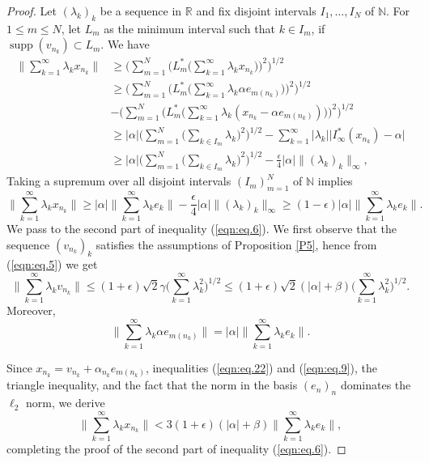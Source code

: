 \documentclass[12pt]{amsart}
\theoremstyle{plain}
\numberwithin{equation}{section}
\newcommand{\N}{\mathbb{N}}
\newcommand{\R}{\mathbb{R}}
\DeclareMathOperator{\supp}{supp}
\begin{document}
\begin{proof}
Let $(\lambda_k)_k$ be a sequence in $\R$ and fix disjoint intervals $I_1,\ldots,I_N$ of $\N$. For $1\leq m\leq N$, let
$L_m$ as the minimum interval such that $k\in I_m$, if $\supp(v_{n_k}) \subset L_m$. We have
\begin{align*}
\Big\|\sum_{k=1}^\infty\lambda_k x_{n_k}\Big\| &\geq \Big(\sum_{m=1}^N\Big( L_m^*\Big( \sum_{k=1}^\infty \lambda_k x_{n_k}\Big) \Big)^2\Big)^{1/2}\\
&\geq \Big(\sum_{m=1}^N\Big( L_m^* \Big(\sum_{k = 1}^\infty \lambda_k \alpha e_{m(n_k)}\Big)\Big)^2\Big)^{1/2}\\
&- \Big(\sum_{m=1}^N\Big(  L_m^*\Big(\sum_{k=1}^\infty \lambda_k (x_{n_k}-\alpha e_{m(n_k)}) \Big)\Big)^2\Big)^{1/2}\\
&\geq |\alpha|\Big(\sum_{m=1}^N\Big(\sum_{k\in I_m}\lambda_k\Big)^2\Big)^{1/2} - \sum_{k=1}^\infty|\lambda_k|\Big|I^*_\infty(x_{n_k}) - \alpha\Big|\\
&\geq |\alpha|\Big(\sum_{m=1}^N\Big(\sum_{k\in I_m}\lambda_k\Big)^2\Big)^{1/2} -\frac{\epsilon}{4}|\alpha|\|(\lambda_k)_k\|_\infty,
\end{align*}
Taking a supremum over all disjoint intervals $(I_m)_{m=1}^N$ of $\N$ implies
\[ \Big\| \sum_{k=1}^\infty \lambda_k x_{n_k}\Big\| \geq |\alpha| \Big\| \sum_{k=1}^\infty \lambda_k e_{k}\Big\|  - \frac{\epsilon}{4}|\alpha|\|(\lambda_k)_k\|_\infty\geq (1-\epsilon)|\alpha|\Big\| \sum_{k=1}^\infty \lambda_k e_{k}\Big\|. \]
We pass to the second part of inequality (\ref{eqn:eq.6}).
We first observe that the sequence $(v_{n_k})_k$ satisfies the assumptions of Proposition \ref{P5}, hence from (\ref{eqn:eq.5}) we get
\begin{equation}\label{eqn:eq.22}
\Big\|\sum_{k=1}^\infty \lambda_k v_{n_k}\Big\| \le (1+\epsilon)\sqrt{2} \gamma \Big(\sum_{k=1}^\infty \lambda_k^2\Big)^{1/2} \leq (1+\epsilon)\sqrt{2} (|\alpha| + \beta) \Big(\sum_{k=1}^\infty \lambda_k^2\Big)^{1/2}.
\end{equation}
Moreover,
\begin{equation}\label{eqn:eq.9}
\Big\| \sum_{k=1}^\infty \lambda_k \alpha e_{m(n_k)}\Big\| = |\alpha| \Big\| \sum_{k=1}^\infty \lambda_k e_k \Big\|.
\end{equation}

Since $x_{n_k} = v_{n_k} + \alpha_{n_k}e_{m(n_k)}$, inequalities (\ref{eqn:eq.22}) and (\ref{eqn:eq.9}), the triangle inequality, and the fact that the norm in the basis $(e_n)_n$ dominates the $\ell_2$ norm, we derive
\[ \Big\| \sum_{k=1}^\infty \lambda_k x_{n_k}\Big\| < 3(1+\epsilon)(|\alpha| + \beta) \Big\| \sum_{k=1}^\infty \lambda_k e_k \Big\|, \]
completing the proof of the second part of inequality (\ref{eqn:eq.6}).
\end{proof}
\end{document}
